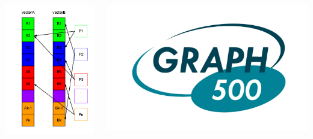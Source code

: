 \documentclass[final]{beamer} %
\begin{document}
\begin{frame}[t]
\begin{columns}[t]
\begin{column}{0.60\paperwidth}
\begin{columns}[t,totalwidth=0.60\paperwidth]
\begin{column}{0.28\paperwidth}
\begin{columns}[t,totalwidth=0.28\paperwidth]
\begin{column}{0.12\paperwidth}
								\begin{center} \includegraphics[width=0.12\paperwidth]{img/rand_access} \end{center}
							\end{column}
							\begin{column}{0.12\paperwidth}
								\begin{center} \includegraphics[width=0.12\paperwidth]{img/logo_graph500} \end{center}

\end{column}
\end{columns}
\end{column}
\end{columns}
\end{column}
\end{columns}
\end{frame}
\end{document}
